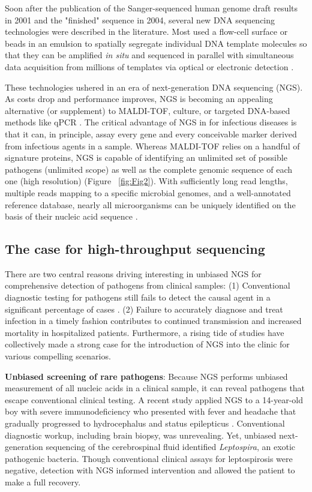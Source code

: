 Soon after the publication of the Sanger-sequenced human genome draft results in 2001 and the "finished" sequence in 2004, several new DNA sequencing technologies were described in the literature. Most used a flow-cell surface or beads in an emulsion to spatially segregate individual DNA template molecules so that they can be amplified \emph{in situ} and sequenced in parallel with simultaneous data acquisition from millions of templates via optical or electronic detection \cite{Boyd:2013cc}.

These technologies ushered in an era of next-generation DNA sequencing (NGS). As costs drop and performance improves, NGS is becoming an appealing alternative (or supplement) to MALDI-TOF, culture, or targeted DNA-based methods like qPCR \cite{Shendure:2012et}. The critical advantage of NGS in for infectious diseases is that it can, in principle, assay every gene and every conceivable marker derived from infectious agents in a sample. Whereas MALDI-TOF relies on a handful of signature proteins, NGS is capable of identifying an unlimited set of possible pathogens (unlimited scope) as well as the complete genomic sequence of each one (high resolution) (Figure ~\ref{fig:Fig2}). With sufficiently long read lengths, multiple reads mapping to a specific microbial genomes, and a well-annotated reference database, nearly all microorganisms can be uniquely identified on the basis of their nucleic acid sequence  \cite{Boyd:2013cc}.

\subsection{The case for high-throughput sequencing}

There are two central reasons driving interesting in unbiased NGS for comprehensive detection of pathogens from clinical samples: (1) Conventional diagnostic testing for pathogens still fails to detect the causal agent in a significant percentage of cases \cite{Naccache:2014gk}. (2) Failure to accurately diagnose and treat infection in a timely fashion contributes to continued transmission and increased mortality in hospitalized patients. Furthermore, a rising tide of studies have collectively made a strong case for the introduction of NGS into the clinic for various compelling scenarios.

\textbf{Unbiased screening of rare pathogens}: Because NGS performs unbiased measurement of all nucleic acids in a clinical sample, it can reveal pathogens that escape conventional clinical testing. A recent study applied NGS to a 14-year-old boy with severe immunodeficiency who presented with fever and headache that gradually progressed to hydrocephalus and status epilepticus \cite{Wilson:2014dv}. Conventional diagnostic workup, including brain biopsy, was unrevealing. Yet, unbiased next-generation sequencing of the cerebrospinal fluid identified \emph{Leptospira}, an exotic pathogenic bacteria. Though conventional clinical assays for leptospirosis were negative, detection with NGS informed intervention and allowed the patient to make a full recovery. 

